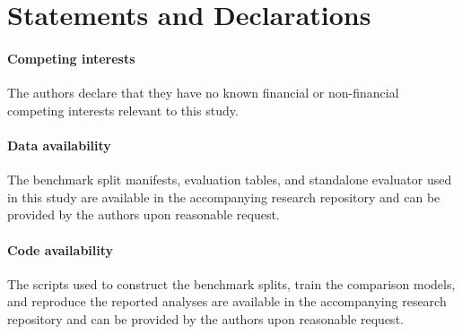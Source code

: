 \section*{Statements and Declarations}

\paragraph{Competing interests}
The authors declare that they have no known financial or non-financial competing interests relevant to this study.

\paragraph{Data availability}
The benchmark split manifests, evaluation tables, and standalone evaluator used in this study are available in the accompanying research repository and can be provided by the authors upon reasonable request.

\paragraph{Code availability}
The scripts used to construct the benchmark splits, train the comparison models, and reproduce the reported analyses are available in the accompanying research repository and can be provided by the authors upon reasonable request.
